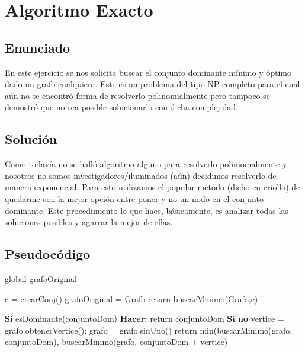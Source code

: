 \section{Algoritmo Exacto}

\subsection{Enunciado}
En este ejercicio se nos solicita buscar el conjunto dominante mínimo y óptimo dado un grafo cualquiera. Este es un problema del tipo NP completo 
para el cual aún no se encontró forma de resolverlo polinomialmente pero tampoco se demostró que no sea posible solucionarlo con dicha complejidad.

\subsection{Soluci\'on}
Como todavía no se halló algoritmo alguno para resolverlo poliniomalmente y nosotros no somos investigadores/iluminados (aún) decidimos resolverlo
de manera exponencial. Para esto utilizamos el popular método (dicho en criollo) de quedarme con la mejor opción entre poner y no un nodo en el 
conjunto dominante. Este procedimiento lo que hace, básicamente, es analizar todas las soluciones posibles y agarrar la mejor de ellas. \\

\subsection{Pseudocódigo}

global grafoOriginal

\begin{codebox}
\li	c = crearConj()
\li	grafoOriginal = Grafo
\li	return buscarMinimo(Grafo,c)
\end{codebox}

\begin{codebox}
\li\textbf{Si} esDominante(conjuntoDom) \textbf{Hacer:} \Do
\li		return conjuntoDom 
\End
\li	\textbf{Si no}  \Do
\li		vertice = grafo.obtenerVertice(); 
\li		grafo = grafo.sinUno()
\li		return min(buscarMinimo(grafo, conjuntoDom), buscarMinimo(grafo, conjuntoDom + vertice)
\li	
\End

\end{codebox}


